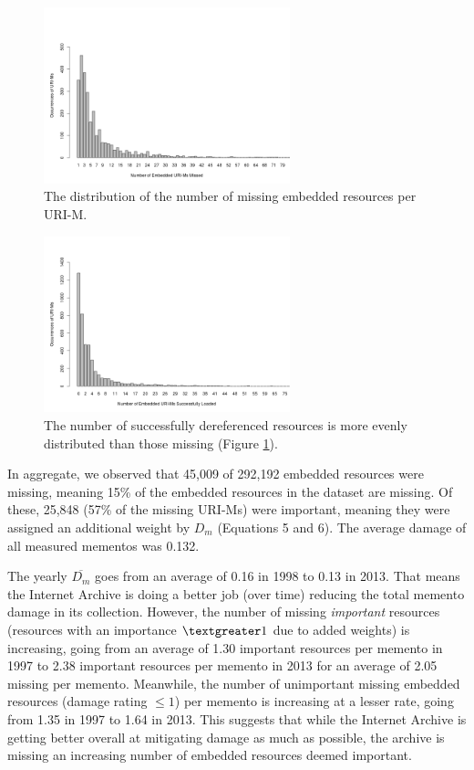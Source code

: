 \begin{figure}[h!]
\includegraphics[width=270px]{./imgs/occStats.png}
\caption{The distribution of the number of missing embedded resources per URI-M.}
\label{missingDistro}
\end{figure}

\begin{figure}[h!]
\includegraphics[width=270px]{./imgs/occStatsFound.png}
\caption{The number of successfully dereferenced resources is more evenly distributed than those missing (Figure \ref{missingDistro}).}
\label{foundDistro}
\end{figure}



In aggregate, we observed that 45,009 of 292,192 embedded resources were missing, meaning 15\% of the embedded resources in the dataset are missing. Of these, 25,848  (57\% of the missing URI-Ms) were important, meaning they were assigned an additional weight by $D_m$ (Equations 5 and 6). The average damage of all measured mementos was 0.132.

The yearly $\overline{D_m}$ goes from an average of 0.16 in 1998 to 0.13 in 2013. That means the Internet Archive is doing a better job (over time) reducing the total memento damage in its collection. However, the number of missing \emph{important} resources (resources with an importance $\textgreater 1$ due to added weights) is increasing, going from an average of 1.30 important resources per memento in 1997 to 2.38 important resources per memento in 2013 for an average of 2.05 missing per memento. Meanwhile, the number of unimportant missing embedded resources (damage rating $\leq 1$) per memento is increasing at a lesser rate, going from 1.35 in 1997 to 1.64 in 2013. This suggests that while the Internet Archive is getting better overall at mitigating damage as much as possible, the archive is missing an increasing number of embedded resources deemed important. 

